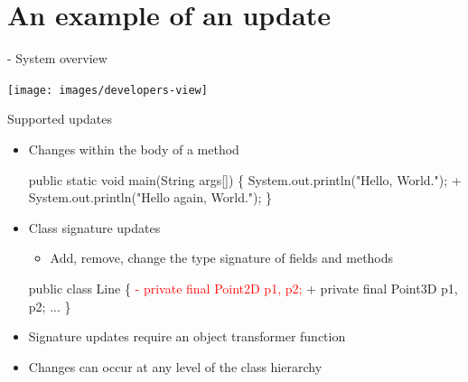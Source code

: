 \newcommand{\removed}[1]{\textcolor{red}{- #1}}
\newcommand{\addedxx}[1]{\textcolor{OliveGreen}{+ #1}}

\section{An example of an update}
\ShowTOC[]

\begin{frame}{\DSU{} - System overview}%
\begin{center}%
\texttt{[image: images/developers-view]}%
\end{center}%
\end{frame}

\begin{frame}[fragile]{Supported updates}%
\begin{itemize}
\item Changes within the body of a method \\
\begin{footnotesize}
\begin{semiverbatim}
  public static void main(String args[]) \{
    System.out.println("Hello, World.");
\addedxx{  System.out.println("Hello again, World.");}
  \}
\end{semiverbatim}
\end{footnotesize}
\item Class signature updates
  \begin{itemize}
  \item Add, remove, change the type signature of fields and methods
  \end{itemize}
\begin{footnotesize}
\begin{semiverbatim}
  public class Line \{
\removed{  private final Point2D p1, p2;}
\addedxx{  private final Point3D p1, p2;}
    ...
  \}
\end{semiverbatim}
\end{footnotesize}
\item Signature updates require an object transformer function
\item Changes can occur at any level of the class hierarchy
\end{itemize}
\end{frame}

